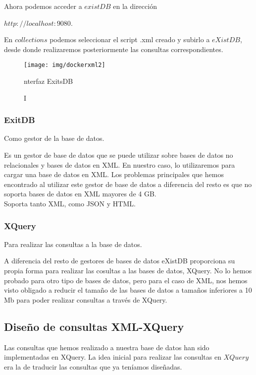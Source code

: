 \documentclass[12pt,a4paper]{article}
\begin{document}
\begin{enumerate}
Ahora podemos acceder a $existDB$ en la dirección
  
$http://localhost:9080$.

En $collections$ podemos seleccionar el script .xml creado y subirlo a $eXistDB$, desde donde realizaremos posteriormente las consultas correspondientes. 


\begin{figure}[!h]
\centering 
\texttt{[image: img/dockerxml2]}
\caption Interfaz ExitsDB
\label{interfazxdb}
\end{figure}
\end{enumerate}

\subsubsection{ExitDB} Como gestor de la base de datos. \label{pto412}

Es un gestor de base de datos que se puede utilizar sobre bases de datos no relacionales y bases de datos en XML. En nuestro caso, lo utilizaremos para cargar una base de datos en XML. Los problemas principales que hemos encontrado al utilizar este gestor de base de datos a diferencia del resto es que no soporta bases de datos en XML mayores de 4 GB.\\

Soporta tanto XML, como JSON y HTML.

\subsubsection{XQuery} Para realizar las consultas a la base de datos. \label{pto413}

A diferencia del resto de gestores de bases de datos eXistDB proporciona su propia forma para realizar las cosultas a las bases de datos, XQuery. No lo hemos probado para otro tipo de bases de datos, pero para el caso de XML, nos hemos visto obligado a reducir el tamaño de las bases de datos a tamaños inferiores a 10 Mb para poder realizar consultas a través de XQuery.


\newpage
\subsection{Diseño de consultas XML-XQuery}  \label{pto42}

Las consultas que hemos realizado a nuestra base de datos han sido implementadas en XQuery. La idea inicial para realizar las consultas en $XQuery$ era la de traducir las consultas que ya teníamos diseñadas.
\end{document}
